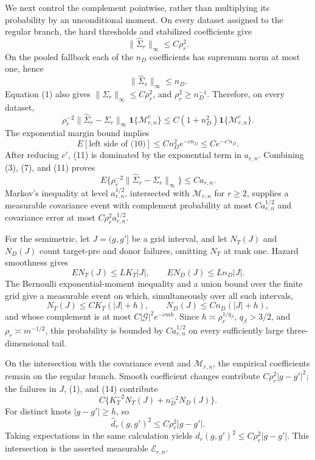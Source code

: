 We next control the complement pointwise, rather than multiplying its probability by an unconditional moment.  On every dataset assigned to the regular branch, the hard thresholds and stabilized coefficients give
\[
 \|\widehat\Sigma_r\|_\infty\le C\rho_r^2.            \tag{8}
\]
On the pooled fallback each of the \(n_D\) coefficients has supremum norm at most one, hence
\[
 \|\widehat\Sigma_r\|_\infty\le n_D.                  \tag{9}
\]
Equation (1) also gives \(\|\Sigma_r\|_\infty\le C\rho_r^2\), and \(\rho_r^2\ge n_D^{-1}\).  Therefore, on every dataset,
\[
 \rho_r^{-2}\|\widehat\Sigma_r-\Sigma_r\|_\infty
 \mathbf1\{\mathcal M_{r,n}^c\}
 \le C(1+n_D^2)\mathbf1\{\mathcal M_{r,n}^c\}.        \tag{10}
\]
The exponential margin bound implies
\[
 E[\text{left side of (10)}]
 \le Cn_D^2e^{-cn_D}\le Ce^{-c'n_D}.                   \tag{11}
\]
After reducing \(c'\), (11) is dominated by the exponential term in \(a_{r,n}\).  Combining (3), (7), and (11) proves
\[
 E\{\rho_r^{-2}\|\widehat\Sigma_r-\Sigma_r\|_\infty\}
 \le Ca_{r,n}.                                          \tag{12}
\]
Markov's inequality at level \(a_{r,n}^{1/2}\), intersected with \(\mathcal M_{r,n}\) for \(r\ge2\), supplies a measurable covariance event with complement probability at most \(Ca_{r,n}^{1/2}\) and covariance error at most \(C\rho_r^2a_{r,n}^{1/2}\).

For the semimetric, let \(J=(g,g']\) be a grid interval, and let \(N_T(J)\) and \(N_D(J)\) count target-pre and donor failures, omitting \(N_T\) at rank one.  Hazard smoothness gives
\[
 EN_T(J)\le LK_T|J|,
 \qquad EN_D(J)\le Ln_D|J|.                             \tag{13}
\]
The Bernoulli exponential-moment inequality and a union bound over the finite grid give a measurable event on which, simultaneously over all such intervals,
\[
 N_T(J)\le CK_T(|J|+h),
 \qquad N_D(J)\le Cn_D(|J|+h),                           \tag{14}
\]
and whose complement is at most \(C|\mathcal G|^2e^{-cmh}\).  Since \(h\asymp\rho_r^{1/q_\beta}\), \(q_\beta>3/2\), and \(\rho_r\asymp m^{-1/2}\), this probability is bounded by \(Ca_{r,n}^{1/2}\) on every sufficiently large three-dimensional tail.

On the intersection with the covariance event and \(\mathcal M_{r,n}\), the empirical coefficients remain on the regular branch.  Smooth coefficient changes contribute \(C\rho_r^2|g-g'|^2\); the failures in \(J\), (1), and (14) contribute
\[
 C\{K_T^{-2}N_T(J)+n_D^{-2}N_D(J)\}.
\]
For distinct knots \(|g-g'|\ge h\), so
\[
 \widehat d_r(g,g')^2\le C\rho_r^2|g-g'|.              \tag{15}
\]
Taking expectations in the same calculation yields \(d_r(g,g')^2\le C\rho_r^2|g-g'|\).  This intersection is the asserted measurable \(\mathcal E_{r,n}\).

